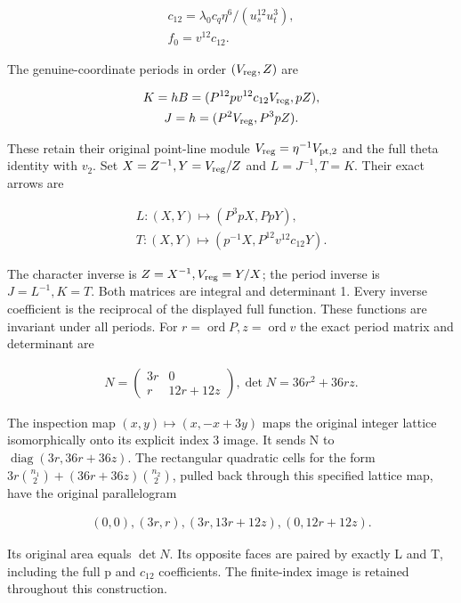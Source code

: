 \[
\begin{gathered}
c_{12}=\lambda_0 c_q \eta^{6}/(u_s^{12} u_t^{3}), \\
f_{0}=v^{12} c_{12}.
\end{gathered}
\]

The genuine-coordinate periods in order \((V_{\rm reg},Z)\) are

\[
\begin{gathered}
K=hB=(P^{12} p v^{12} c_{12} V_{\rm reg},p Z), \\
J=h=(P^{2} V_{\rm reg},P^{3}p Z).
\end{gathered}
\]

These retain their original point-line module \(V_{\rm reg}=\eta^{-1} V_{{\rm pt},2}\)
and the full theta identity with \(v_{2}\). Set \(X=Z^{-1},Y=V_{\rm reg}/Z\) and
\(L=J^{-1},T=K\). Their exact arrows are

\[
\begin{gathered}
L:(X,Y)\longmapsto (P^{3}p X,Pp Y), \\
T:(X,Y)\longmapsto (p^{-1} X,P^{12} v^{12} c_{12} Y).
\end{gathered}
\]

The character inverse is \(Z=X^{-1},V_{\rm reg}=Y/X\); the period inverse
is \(J=L^{-1},K=T\). Both matrices are integral and determinant 1.
Every inverse coefficient is the reciprocal of the displayed
full function. These functions are invariant under all periods.
For \(r=\operatorname{ord} P,z=\operatorname{ord} v\) the exact period matrix and determinant are

\[
\begin{gathered}
N=\begin{pmatrix}3r&0\\r&12r+12z\end{pmatrix}, \operatorname{det} N=36r^{2}+36rz.
\end{gathered}
\]

The inspection map \((x,y)\longmapsto (x,-x+3y)\) maps the original integer
lattice isomorphically onto its explicit index 3 image. It sends
N to \(\operatorname{diag}(3r,36r+36z)\). The rectangular quadratic cells for the
form \(3r \binom{n_{1}}{2}+(36r+36z)\binom{n_{2}}{2}\), pulled back through
this specified lattice map, have the original parallelogram

\[
\begin{gathered}
(0,0),(3r,r),(3r,13r+12z),(0,12r+12z).
\end{gathered}
\]

Its original area equals \(\operatorname{det} N\). Its opposite faces are paired
by exactly L and T, including the full p and \(c_{12}\) coefficients.
The finite-index image is retained throughout this construction.


